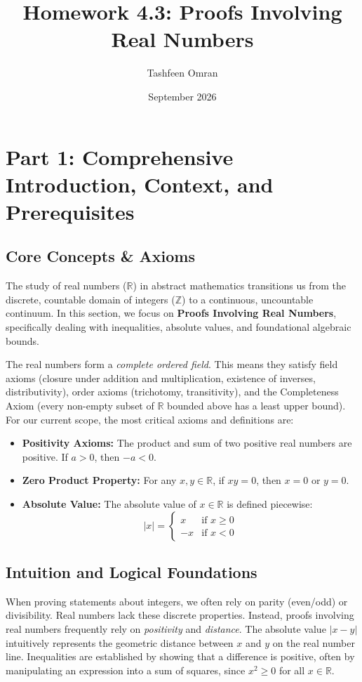 \documentclass[11pt]{article}
\title{\textbf{Homework 4.3: Proofs Involving Real Numbers}}
\author{Tashfeen Omran}
\date{September 2026}
\newcommand{\R}{\mathbb{R}}
\newcommand{\Z}{\mathbb{Z}}
\newcommand{\abs}[1]{\left|#1\right|}
\begin{document}
\maketitle
\tableofcontents
\newpage

\section{Part 1: Comprehensive Introduction, Context, and Prerequisites}

\subsection{Core Concepts \& Axioms}
The study of real numbers ($\R$) in abstract mathematics transitions us from the discrete, countable domain of integers ($\Z$) to a continuous, uncountable continuum. In this section, we focus on \textbf{Proofs Involving Real Numbers}, specifically dealing with inequalities, absolute values, and foundational algebraic bounds. 

The real numbers form a \textit{complete ordered field}. This means they satisfy field axioms (closure under addition and multiplication, existence of inverses, distributivity), order axioms (trichotomy, transitivity), and the Completeness Axiom (every non-empty subset of $\R$ bounded above has a least upper bound). For our current scope, the most critical axioms and definitions are:
\begin{itemize}
    \item \textbf{Positivity Axioms:} The product and sum of two positive real numbers are positive. If $a > 0$, then $-a < 0$.
    \item \textbf{Zero Product Property:} For any $x, y \in \R$, if $xy = 0$, then $x = 0$ or $y = 0$.
    \item \textbf{Absolute Value:} The absolute value of $x \in \R$ is defined piecewise: 
    \[
    \abs{x} = 
    \begin{cases} 
      x & \text{if } x \ge 0 \\
      -x & \text{if } x < 0 
    \end{cases}
    \]
\end{itemize}

\subsection{Intuition and Logical Foundations}
When proving statements about integers, we often rely on parity (even/odd) or divisibility. Real numbers lack these discrete properties. Instead, proofs involving real numbers frequently rely on \textit{positivity} and \textit{distance}. 
The absolute value $\abs{x - y}$ intuitively represents the geometric distance between $x$ and $y$ on the real number line. Inequalities are established by showing that a difference is positive, often by manipulating an expression into a sum of squares, since $x^2 \ge 0$ for all $x \in \R$.
\end{document}
